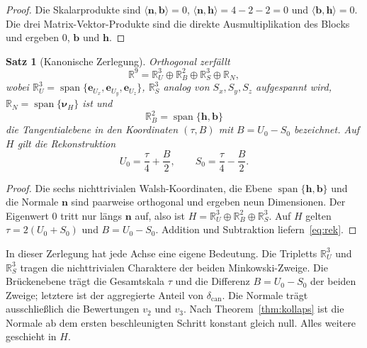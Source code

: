 \documentclass[11pt,a4paper]{article}
\theoremstyle{plain}
\newtheorem{theorem}{Satz}[section]
\theoremstyle{definition}
\newcommand{\R}{\mathbb{R}}
\numberwithin{equation}{section}
\begin{document}
\begin{proof}
Die Skalarprodukte sind
$\langle\mathbf{n},\mathbf{b}\rangle=0$,
$\langle\mathbf{n},\mathbf{h}\rangle=4-2-2=0$ und
$\langle\mathbf{b},\mathbf{h}\rangle=0$.
Die drei Matrix-Vektor-Produkte sind die direkte Ausmultiplikation des
Blocks und ergeben $0$, $\mathbf{b}$ und $\mathbf{h}$.
\end{proof}

\begin{theorem}[Kanonische Zerlegung]
\label{thm:zerlegung}
Orthogonal zerfällt
\begin{equation}
\R^9=\R^3_U\oplus\R^2_B\oplus\R^3_S\oplus\R_N,
\end{equation}
wobei $\R^3_U=\operatorname{span}\{\mathbf{e}_{U_x},\mathbf{e}_{U_y},\mathbf{e}_{U_z}\}$,
$\R^3_S$ analog von $S_x,S_y,S_z$ aufgespannt wird,
$\R_N=\operatorname{span}\{\boldsymbol{\nu}_H\}$ ist und
\begin{equation}
\R^2_B=\operatorname{span}\{\mathbf{h},\mathbf{b}\}
\end{equation}
die Tangentialebene in den Koordinaten $(\tau,B)$ mit $B=U_0-S_0$ bezeichnet.
Auf $H$ gilt die Rekonstruktion
\begin{equation}
\label{eq:rek}
U_0=\frac{\tau}{4}+\frac{B}{2},
\qquad
S_0=\frac{\tau}{4}-\frac{B}{2}.
\end{equation}
\end{theorem}

\begin{proof}
Die sechs nichttrivialen Walsh-Koordinaten, die Ebene
$\operatorname{span}\{\mathbf{h},\mathbf{b}\}$ und die Normale $\mathbf{n}$
sind paarweise orthogonal und ergeben neun Dimensionen.
Der Eigenwert $0$ tritt nur längs $\mathbf{n}$ auf, also ist
$H=\R^3_U\oplus\R^2_B\oplus\R^3_S$.
Auf $H$ gelten $\tau=2(U_0+S_0)$ und $B=U_0-S_0$.
Addition und Subtraktion liefern~\eqref{eq:rek}.
\end{proof}

In dieser Zerlegung hat jede Achse eine eigene Bedeutung.
Die Tripletts $\R^3_U$ und $\R^3_S$ tragen die nichttrivialen Charaktere der
beiden Minkowski-Zweige.
Die Brückenebene trägt die Gesamtskala $\tau$ und die Differenz
$B=U_0-S_0$ der beiden Zweige; letztere ist der aggregierte Anteil von
$\delta_{\mathrm{can}}$.
Die Normale trägt ausschließlich die Bewertungen $v_2$ und $v_3$.
Nach Theorem~\ref{thm:kollaps} ist die Normale ab dem ersten beschleunigten
Schritt konstant gleich null.
Alles weitere geschieht in $H$.

\end{document}
